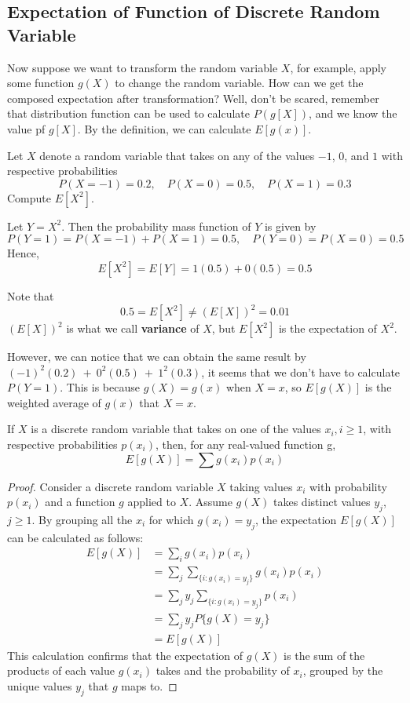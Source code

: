\subsection{Expectation of Function of Discrete Random Variable}
Now suppose we want to transform the random variable $X$, for example, apply some function $g(X)$ to change the random variable.
How can we get the composed expectation after transformation? Well, don't be scared, remember that distribution function can be used to calculate $P(g[X])$, and we know the value pf $g[X]$. By the definition, we can calculate $E[g(x)]$.

\begin{example}
    Let $X$ denote a random variable that takes on any of the values $-1$, $0$, and $1$ with respective probabilities
\[
P(X = -1) = 0.2, \quad P(X = 0) = 0.5, \quad P(X = 1) = 0.3
\]
Compute $E[X^2]$.
\begin{solution}
    Let $Y = X^2$. Then the probability mass function of $Y$ is given by
\[
P(Y = 1) = P(X = -1) + P(X = 1) = 0.5, \quad P(Y = 0) = P(X = 0) = 0.5
\]
Hence,
\[
E[X^2] = E[Y] = 1(0.5) + 0(0.5) = 0.5
\]
\begin{remark}
Note that
\[
0.5 = E[X^2] \neq (E[X])^2 = 0.01
\]
$(E[X])^2$ is what we call \textbf{variance} of $X$, but $E[X^2]$ is the expectation of $X^2$.
\end{remark}

\end{solution}
\end{example}

However, we can notice that  we can obtain the same result by 
$(-1)^{2}(0.2)\:+\:0^{2}(0.5)\:+\:1^{2}(0.3)$, it seems that we don't have to calculate $P(Y=1)$. This is because $g(X) = g(x)$ when $X = x$, so $E[g(X)]$ is the weighted average of $g(x)$ that $X=x$.
\begin{proposition}
    If $X$ is a discrete random variable that takes on one of the values $x_i,i\geq1$, with
respective probabilities $p(x_i)$, then, for any real-valued function g,
$$E[g(X)]=\sum g(x_i)p(x_i)$$
\end{proposition}
\begin{proof}
Consider a discrete random variable \(X\) taking values \(x_i\) with probability \(p(x_i)\) and a function \(g\) applied to \(X\). Assume \(g(X)\) takes distinct values \(y_j\), \(j \geq 1\). By grouping all the \(x_i\) for which \(g(x_i) = y_j\), the expectation \(E[g(X)]\) can be calculated as follows:
\begin{align*}
E[g(X)] &= \sum_i g(x_i)p(x_i) \\
&= \sum_j \sum_{\{i : g(x_i) = y_j\}} g(x_i)p(x_i) \\
&= \sum_j y_j \sum_{\{i : g(x_i) = y_j\}} p(x_i) \\
&= \sum_j y_j P\{g(X) = y_j\} \\
&= E[g(X)]
\end{align*}
This calculation confirms that the expectation of \(g(X)\) is the sum of the products of each value \(g(x_i)\) takes and the probability of \(x_i\), grouped by the unique values \(y_j\) that \(g\) maps to.
\end{proof}

